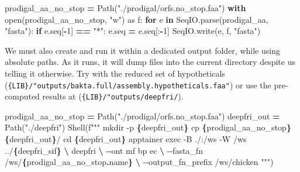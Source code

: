 \documentclass[
]{book}
\newenvironment{Shaded}{\begin{snugshade}}{\end{snugshade}}
\newcommand{\BuiltInTok}[1]{#1}
\newcommand{\ControlFlowTok}[1]{\textcolor[rgb]{0.13,0.29,0.53}{\textbf{#1}}}
\newcommand{\DecValTok}[1]{\textcolor[rgb]{0.00,0.00,0.81}{#1}}
\newcommand{\ImportTok}[1]{#1}
\newcommand{\KeywordTok}[1]{\textcolor[rgb]{0.13,0.29,0.53}{\textbf{#1}}}
\newcommand{\NormalTok}[1]{#1}
\newcommand{\OperatorTok}[1]{\textcolor[rgb]{0.81,0.36,0.00}{\textbf{#1}}}
\newcommand{\SpecialCharTok}[1]{\textcolor[rgb]{0.81,0.36,0.00}{\textbf{#1}}}
\newcommand{\SpecialStringTok}[1]{\textcolor[rgb]{0.31,0.60,0.02}{#1}}
\newcommand{\StringTok}[1]{\textcolor[rgb]{0.31,0.60,0.02}{#1}}
\begin{document}
\begin{Shaded}
\begin{Highlighting}[numbers=left,,]
\NormalTok{prodigal\_aa\_no\_stop }\OperatorTok{=}\NormalTok{ Path(}\StringTok{"./prodigal/orfs.no\_stop.faa"}\NormalTok{)}
\ControlFlowTok{with} \BuiltInTok{open}\NormalTok{(prodigal\_aa\_no\_stop, }\StringTok{"w"}\NormalTok{) }\ImportTok{as}\NormalTok{ f:}
    \ControlFlowTok{for}\NormalTok{ e }\KeywordTok{in}\NormalTok{ SeqIO.parse(prodigal\_aa, }\StringTok{"fasta"}\NormalTok{):}
        \ControlFlowTok{if}\NormalTok{ e.seq[}\OperatorTok{{-}}\DecValTok{1}\NormalTok{] }\OperatorTok{==} \StringTok{"*"}\NormalTok{:}
\NormalTok{            e.seq }\OperatorTok{=}\NormalTok{ e.seq[:}\OperatorTok{{-}}\DecValTok{1}\NormalTok{]}
\NormalTok{        SeqIO.write(e, f, }\StringTok{"fasta"}\NormalTok{)}
\end{Highlighting}
\end{Shaded}

We must also create and run it within a dedicated output folder, while using absolute paths.
As it runs, it will dump files into the current directory despite us telling it otherwise.
Try with the reduced set of hypotheticals (\texttt{\{LIB\}/"outputs/bakta.full/assembly.hypotheticals.faa"})
or use the pre-computed results at (\texttt{\{LIB\}/"outputs/deepfri/}).

\begin{Shaded}
\begin{Highlighting}[numbers=left,,]
\NormalTok{prodigal\_aa\_no\_stop }\OperatorTok{=}\NormalTok{ Path(}\StringTok{"./prodigal/orfs.no\_stop.faa"}\NormalTok{)}
\NormalTok{deepfri\_out }\OperatorTok{=}\NormalTok{ Path(}\StringTok{"./deepfri"}\NormalTok{)}
\NormalTok{Shell(}\SpecialStringTok{f"""}
\SpecialStringTok{mkdir {-}p }\SpecialCharTok{\{}\NormalTok{deepfri\_out}\SpecialCharTok{\}}
\SpecialStringTok{cp }\SpecialCharTok{\{}\NormalTok{prodigal\_aa\_no\_stop}\SpecialCharTok{\}}\SpecialStringTok{ }\SpecialCharTok{\{}\NormalTok{deepfri\_out}\SpecialCharTok{\}}\SpecialStringTok{/}
\SpecialStringTok{cd }\SpecialCharTok{\{}\NormalTok{deepfri\_out}\SpecialCharTok{\}}
\SpecialStringTok{apptainer exec {-}B ./:/ws {-}W /ws ../}\SpecialCharTok{\{}\NormalTok{deepfri\_sif}\SpecialCharTok{\}}\SpecialStringTok{ }\OperatorTok{\textbackslash{}}
\SpecialStringTok{    deepfri }\OperatorTok{\textbackslash{}}
\SpecialStringTok{        {-}{-}ont mf bp ec }\OperatorTok{\textbackslash{}}
\SpecialStringTok{        {-}{-}fasta\_fn /ws/}\SpecialCharTok{\{}\NormalTok{prodigal\_aa\_no\_stop}\SpecialCharTok{.}\NormalTok{name}\SpecialCharTok{\}}\SpecialStringTok{ }\OperatorTok{\textbackslash{}}
\SpecialStringTok{        {-}{-}output\_fn\_prefix /ws/chicken}
\SpecialStringTok{"""}\NormalTok{)}
\end{Highlighting}
\end{Shaded}
\end{document}
